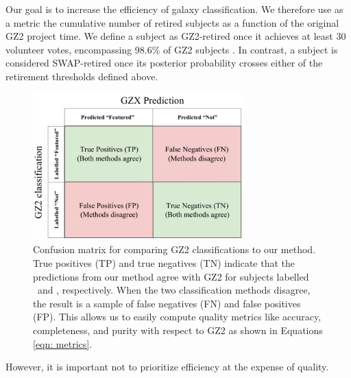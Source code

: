 Our goal is to increase the efficiency of galaxy classification. We therefore  use as a metric the cumulative number of retired subjects as a function of the original GZ2 project time. We define a subject as GZ2-retired once it achieves at least 30 volunteer votes, encompassing 98.6\% of GZ2 subjects .  In contrast, a subject is considered SWAP-retired once its posterior probability crosses either of the retirement thresholds defined above. 

\begin{figure}[t!] 
\centering
\includegraphics[width=3.2in]{Figures/human_machine/confusionmatrix.pdf}
\caption[Confusion matrix between predictions and ground truth defines quality metrics.]{Confusion matrix for comparing GZ2 classifications to our method.  True positives (TP) and true negatives (TN) indicate that the predictions from our method agree with GZ2 for subjects labelled \feat~and \notfeat, respectively. When the two classification methods disagree, the result is a sample of false negatives (FN) and false positives (FP). This allows us to easily compute  quality metrics like accuracy, completeness, and purity with respect to GZ2 as shown in Equations \ref{eqn: metrics}.} \label{fig: confusionmatrix}
\end{figure}

However, it is important not to prioritize efficiency at the expense of quality. 
 

